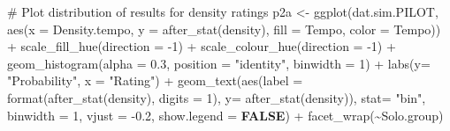\documentclass[
  bookmarksnumbered]{article}
\newenvironment{Shaded}{\begin{snugshade}}{\end{snugshade}}
\newcommand{\AttributeTok}[1]{\textcolor[rgb]{0.80,0.80,0.80}{#1}}
\newcommand{\CommentTok}[1]{\textcolor[rgb]{0.50,0.62,0.50}{#1}}
\newcommand{\ConstantTok}[1]{\textcolor[rgb]{0.86,0.64,0.64}{\textbf{#1}}}
\newcommand{\DecValTok}[1]{\textcolor[rgb]{0.86,0.86,0.80}{#1}}
\newcommand{\FloatTok}[1]{\textcolor[rgb]{0.75,0.75,0.82}{#1}}
\newcommand{\FunctionTok}[1]{\textcolor[rgb]{0.94,0.94,0.56}{#1}}
\newcommand{\NormalTok}[1]{\textcolor[rgb]{0.80,0.80,0.80}{#1}}
\newcommand{\OtherTok}[1]{\textcolor[rgb]{0.94,0.94,0.56}{#1}}
\newcommand{\SpecialCharTok}[1]{\textcolor[rgb]{0.86,0.64,0.64}{#1}}
\newcommand{\StringTok}[1]{\textcolor[rgb]{0.80,0.58,0.58}{#1}}
\begin{document}
\begin{Shaded}
\begin{Highlighting}[]
\CommentTok{\# Plot distribution of results for density ratings}
\NormalTok{p2a }\OtherTok{\textless{}{-}} \FunctionTok{ggplot}\NormalTok{(dat.sim.PILOT, }\FunctionTok{aes}\NormalTok{(}\AttributeTok{x =}\NormalTok{ Density.tempo, }\AttributeTok{y =} \FunctionTok{after\_stat}\NormalTok{(density),}
                                 \AttributeTok{fill =}\NormalTok{ Tempo, }\AttributeTok{color =}\NormalTok{ Tempo)) }\SpecialCharTok{+}
  \FunctionTok{scale\_fill\_hue}\NormalTok{(}\AttributeTok{direction =} \SpecialCharTok{{-}}\DecValTok{1}\NormalTok{) }\SpecialCharTok{+} \FunctionTok{scale\_colour\_hue}\NormalTok{(}\AttributeTok{direction =} \SpecialCharTok{{-}}\DecValTok{1}\NormalTok{) }\SpecialCharTok{+}
  \FunctionTok{geom\_histogram}\NormalTok{(}\AttributeTok{alpha =} \FloatTok{0.3}\NormalTok{, }\AttributeTok{position =} \StringTok{"identity"}\NormalTok{, }\AttributeTok{binwidth =} \DecValTok{1}\NormalTok{) }\SpecialCharTok{+}
  \FunctionTok{labs}\NormalTok{(}\AttributeTok{y=} \StringTok{"Probability"}\NormalTok{, }\AttributeTok{x =} \StringTok{"Rating"}\NormalTok{) }\SpecialCharTok{+}
  \FunctionTok{geom\_text}\NormalTok{(}\FunctionTok{aes}\NormalTok{(}\AttributeTok{label =} \FunctionTok{format}\NormalTok{(}\FunctionTok{after\_stat}\NormalTok{(density), }\AttributeTok{digits =} \DecValTok{1}\NormalTok{), }\AttributeTok{y=} \FunctionTok{after\_stat}\NormalTok{(density)), }
            \AttributeTok{stat=} \StringTok{"bin"}\NormalTok{, }\AttributeTok{binwidth =} \DecValTok{1}\NormalTok{, }
            \AttributeTok{vjust =} \SpecialCharTok{{-}}\FloatTok{0.2}\NormalTok{,}
            \AttributeTok{show.legend =} \ConstantTok{FALSE}\NormalTok{) }\SpecialCharTok{+}
  \FunctionTok{facet\_wrap}\NormalTok{(}\SpecialCharTok{\textasciitilde{}}\NormalTok{Solo.group)}


\end{Highlighting}
\end{Shaded}
\end{document}
